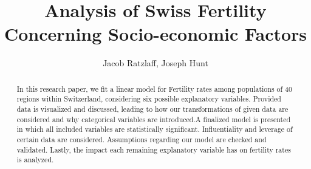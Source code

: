 \documentclass[preprint,12pt]{elsarticle}
\begin{document}
\begin{frontmatter}


\title{Analysis of Swiss Fertility Concerning Socio-economic Factors}




\author{Jacob Ratzlaff, Joseph Hunt}

\address{Colorado School of Mines}

\begin{abstract}
\noindent In this research paper, we fit a linear model for Fertility rates among populations of 40 regions within Switzerland, considering six possible explanatory variables. Provided data is visualized and discussed, leading to how our transformations of given data are considered and why categorical variables are introduced.A finalized model is presented in which all included variables are statistically significant. Influentiality and leverage of certain data are considered. Assumptions regarding our model are checked and validated. Lastly, the impact each remaining explanatory variable has on fertility rates is analyzed.
\end{abstract}



\end{frontmatter}
\end{document}
